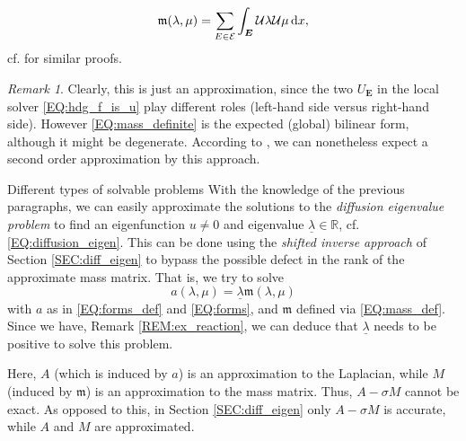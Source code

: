 \documentclass[a4paper, english, 12pt, reqno, draft]{amsart}
\makeatletter
\theoremstyle{definition}
\theoremstyle{remark}
\newtheorem{remark}[theorem]{Remark}
\numberwithin{equation}{section}
\newcommand{\setEdge}{\ensuremath{\mathcal E}}
\newcommand{\edge}{\ensuremath{E}}
\newcommand{\Edge}{{\ensuremath{\boldsymbol E}}}
\newcommand{\IR}{\ensuremath{\mathbb R}}
\newcommand{\dx}{\ensuremath{\, \textup d x}}
\newcommand{\localU}{\ensuremath{\mathcal U}}
\newcommand{\mass}{\ensuremath{\mathfrak m}}
\newcommand{\eigenval}{\ensuremath{\underline \lambda}}
\def\paragraph{\@startsection{paragraph}{4}%
  \z@\z@{-\fontdimen2\font}%
  {\normalfont\scshape}}
\makeatother
\begin{document}
% 
\begin{equation}\label{EQ:mass_definite}
 \mass (\lambda,\mu) = \sum_{\edge \in \setEdge} \int_\Edge \localU \lambda \localU \mu \dx,
\end{equation}
% 
cf. \cite{CockburnGL2009,GopalakrishnanLNP2014} for similar proofs.
% 
\begin{remark}
 Clearly, this is just an approximation, since the two $U_\Edge$ in the local solver \eqref{EQ:hdg_f_is_u} play different roles (left-hand side versus right-hand side). However \eqref{EQ:mass_definite} is the expected (global) bilinear form, although it might be degenerate. According to \cite{GopalakrishnanLNP2014}, we can nonetheless expect a second order approximation by this approach.
\end{remark}
% 
\paragraph{Different types of solvable problems}
% 
With the knowledge of the previous paragraphs, we can easily approximate the solutions to the \emph{diffusion eigenvalue problem} to find an eigenfunction $u \neq 0$ and eigenvalue $\eigenval \in \IR$, cf. \eqref{EQ:diffusion_eigen}. This can be done using the \emph{shifted inverse approach} of Section \ref{SEC:diff_eigen} to bypass the possible defect in the rank of the approximate mass matrix. That is, we try to solve
% 
\begin{equation}\label{EQ:eigs_mass}
 a(\lambda, \mu) = \eigenval \mass(\lambda,\mu)
\end{equation}
% 
with $a$ as in \eqref{EQ:forms_def} and \eqref{EQ:forms}, and $\mass$ defined via \eqref{EQ:mass_def}. Since we have, Remark \ref{REM:ex_reaction}, we can deduce that $\eigenval$ needs to be positive to solve this problem.

Here, $A$ (which is induced by $a$) is an approximation to the Laplacian, while $M$ (induced by $\mass$) is an approximation to the mass matrix. Thus, $A - \sigma M$ cannot be exact. As opposed to this, in Section \ref{SEC:diff_eigen} only $A - \sigma M$ is accurate, while $A$ and $M$ are approximated.
\end{document}
